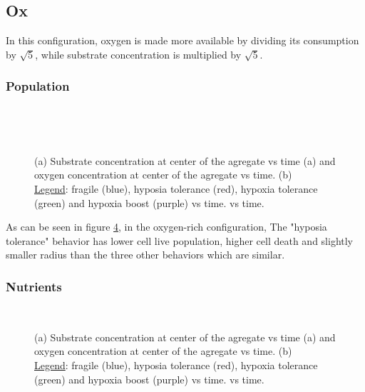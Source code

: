 \documentclass[11pt,a4paper]{article}
\begin{document}
\subsection{Ox}
In this configuration, oxygen is made more available by dividing its consumption by $\sqrt{5}$, while substrate concentration is multiplied by $\sqrt{5}$.

\subsubsection{Population}
\begin{figure}[h]
\begin{subfigure}{0.32\textwidth}
	\centering
	
	\caption{ \label{OS_live_Gl}}
\end{subfigure}
~~
\begin{subfigure}{0.32\textwidth}
	\centering
	
	\caption{\label{OS_Rad_Gl}}
\end{subfigure}
~~
\begin{subfigure}{0.32\textwidth}
	\centering
	
	\caption{\label{OS_dead_Gl}}
\end{subfigure}
\caption{(a) Substrate concentration at center of the agregate  vs time (a) and oxygen concentration at center of the agregate  vs time. (b) \\
\underline{Legend}: fragile (blue), hyposia tolerance (red), hypoxia tolerance (green) and hypoxia boost (purple) vs time. vs time. \label{OS_numbers_Gl}}
\end{figure}

As can be seen in figure \ref{OS_numbers_Gl}, in the oxygen-rich configuration, The "hyposia tolerance" behavior has lower cell live population, higher cell death and slightly smaller radius than the three other behaviors which are similar.\\


\subsubsection{Nutrients}
\begin{figure}[h]
\begin{subfigure}{0.5\textwidth}
	\centering
	
	\caption{ \label{OS_S_Gl}}
\end{subfigure}
~~
\begin{subfigure}{0.5\textwidth}
	\centering
	
	\caption{\label{OS_O_Gl}}
\end{subfigure}
\caption{(a) Substrate concentration at center of the agregate  vs time (a) and oxygen concentration at center of the agregate  vs time. (b) \\
\underline{Legend}: fragile (blue), hyposia tolerance (red), hypoxia tolerance (green) and hypoxia boost (purple) vs time. vs time. \label{OS_nutrients_Gl}}
\end{figure}
\end{document}

